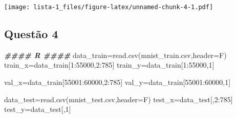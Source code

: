 \documentclass[
]{article}
\newenvironment{Shaded}{\begin{snugshade}}{\end{snugshade}}
\newcommand{\AttributeTok}[1]{\textcolor[rgb]{0.77,0.63,0.00}{#1}}
\newcommand{\DecValTok}[1]{\textcolor[rgb]{0.00,0.00,0.81}{#1}}
\newcommand{\DocumentationTok}[1]{\textcolor[rgb]{0.56,0.35,0.01}{\textbf{\textit{#1}}}}
\newcommand{\FunctionTok}[1]{\textcolor[rgb]{0.00,0.00,0.00}{#1}}
\newcommand{\NormalTok}[1]{#1}
\newcommand{\OtherTok}[1]{\textcolor[rgb]{0.56,0.35,0.01}{#1}}
\newcommand{\SpecialCharTok}[1]{\textcolor[rgb]{0.00,0.00,0.00}{#1}}
\newcommand{\StringTok}[1]{\textcolor[rgb]{0.31,0.60,0.02}{#1}}
\begin{document}
\texttt{[image: lista-1\_files/figure-latex/unnamed-chunk-4-1.pdf]}

\hypertarget{questuxe3o-4}{%
\subsection{Questão 4}\label{questuxe3o-4}}

\begin{Shaded}
\begin{Highlighting}[]
\DocumentationTok{\#\#\#\# R \#\#\#\#}
\NormalTok{data\_train}\OtherTok{=}\FunctionTok{read.csv}\NormalTok{(}\StringTok{\textquotesingle{}mnist\_train.csv\textquotesingle{}}\NormalTok{,}\AttributeTok{header=}\NormalTok{F)}
\NormalTok{train\_x}\OtherTok{=}\NormalTok{data\_train[}\DecValTok{1}\SpecialCharTok{:}\DecValTok{55000}\NormalTok{,}\DecValTok{2}\SpecialCharTok{:}\DecValTok{785}\NormalTok{]}
\NormalTok{train\_y}\OtherTok{=}\NormalTok{data\_train[}\DecValTok{1}\SpecialCharTok{:}\DecValTok{55000}\NormalTok{,}\DecValTok{1}\NormalTok{]}

\NormalTok{val\_x}\OtherTok{=}\NormalTok{data\_train[}\DecValTok{55001}\SpecialCharTok{:}\DecValTok{60000}\NormalTok{,}\DecValTok{2}\SpecialCharTok{:}\DecValTok{785}\NormalTok{]}
\NormalTok{val\_y}\OtherTok{=}\NormalTok{data\_train[}\DecValTok{55001}\SpecialCharTok{:}\DecValTok{60000}\NormalTok{,}\DecValTok{1}\NormalTok{]}

\NormalTok{data\_test}\OtherTok{=}\FunctionTok{read.csv}\NormalTok{(}\StringTok{\textquotesingle{}mnist\_test.csv\textquotesingle{}}\NormalTok{,}\AttributeTok{header=}\NormalTok{F)}
\NormalTok{test\_x}\OtherTok{=}\NormalTok{data\_test[,}\DecValTok{2}\SpecialCharTok{:}\DecValTok{785}\NormalTok{]}
\NormalTok{test\_y}\OtherTok{=}\NormalTok{data\_test[,}\DecValTok{1}\NormalTok{]}
\end{Highlighting}
\end{Shaded}
\end{document}
